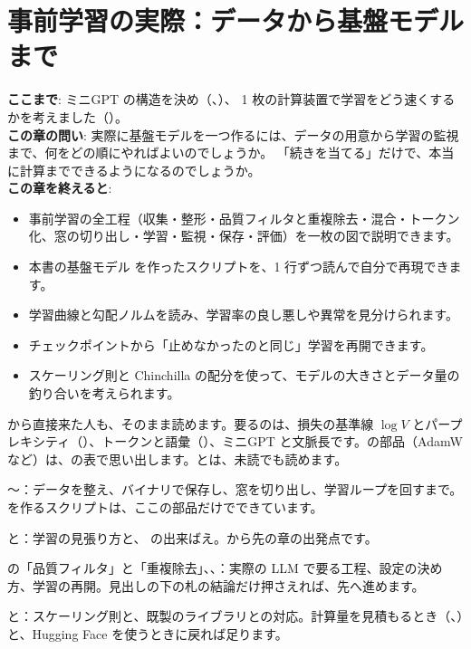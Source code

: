 \chapter{事前学習の実際：データから基盤モデルまで}\label{ch:pretraining}

\begin{chapterlead}
\textbf{ここまで}: ミニGPT の構造を決め（、）、
1 枚の計算装置で学習をどう速くするかを考えました（）。\\[1mm]
\textbf{この章の問い}: 実際に基盤モデルを一つ作るには、データの用意から学習の監視まで、何をどの順にやればよいのでしょうか。
「続きを当てる」だけで、本当に計算までできるようになるのでしょうか。\\[1mm]
\textbf{この章を終えると}:
\begin{itemize}
\item 事前学習の全工程（収集・整形・品質フィルタと重複除去・混合・トークン化、窓の切り出し・学習・監視・保存・評価）を一枚の図で説明できます。
\item 本書の基盤モデル  を作ったスクリプトを、1 行ずつ読んで自分で再現できます。
\item 学習曲線と勾配ノルムを読み、学習率の良し悪しや異常を見分けられます。
\item チェックポイントから「止めなかったのと同じ」学習を再開できます。
\item スケーリング則と Chinchilla の配分を使って、モデルの大きさとデータ量の釣り合いを考えられます。
\end{itemize}
\end{chapterlead}

\begin{readingguide}
\item[\rgpre] から直接来た人も、そのまま読めます。要るのは、損失の基準線 $\log V$ とパープレキシティ（）、トークンと語彙（）、ミニGPT と文脈長です。の部品（AdamW など）は、の表で思い出します。とは、未読でも読めます。
\item[\rgmust] 〜：データを整え、バイナリで保存し、窓を切り出し、学習ループを回すまで。 を作るスクリプトは、ここの部品だけでできています。
\item[\rgmust] と：学習の見張り方と、 の出来ばえ。から先の章の出発点です。
\item[\rgskim] の「品質フィルタ」と「重複除去」、、：実際の LLM で要る工程、設定の決め方、学習の再開。見出しの下の札の結論だけ押さえれば、先へ進めます。
\item[\rglater] と：スケーリング則と、既製のライブラリとの対応。計算量を見積もるとき（、）と、Hugging Face を使うときに戻れば足ります。
\end{readingguide}

